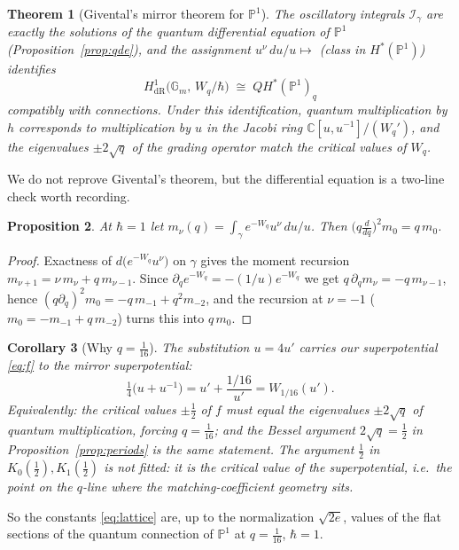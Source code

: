 \documentclass[11pt]{article}
\newtheorem{proposition}{Proposition}[section]
\newtheorem{theorem}[proposition]{Theorem}
\newtheorem{corollary}[proposition]{Corollary}
\theoremstyle{definition}
\theoremstyle{remark}
\newcommand{\C}{\mathbb{C}}
\newcommand{\Gm}{\mathbb{G}_m}
\newcommand{\PP}{\mathbb{P}}
\newcommand{\dR}{\mathrm{dR}}
\newcommand{\hbarr}{\hbar}
\begin{document}
\begin{theorem}[Givental's mirror theorem for $\PP^1$]
\label{thm:mirror}
The oscillatory integrals $\mathcal I_\gamma$ are exactly the
solutions of the quantum differential equation of $\PP^1$
(Proposition~\ref{prop:qde}), and the assignment
$u^\nu\,du/u \mapsto$ (class in $H^\ast(\PP^1)$) identifies
\[
  H^1_{\dR}\bigl(\Gm,\, W_q/\hbarr\bigr) \;\cong\;
  QH^\ast(\PP^1)_q
\]
compatibly with connections. Under this identification, quantum
multiplication by $h$ corresponds to multiplication by $u$ in the
Jacobi ring $\C[u,u^{-1}]/(W_q')$, and the eigenvalues
$\pm 2\sqrt q$ of the grading operator match the critical values of
$W_q$.
\end{theorem}

We do not reprove Givental's theorem, but the differential
equation is a two-line check worth recording.

\begin{proposition}
At $\hbarr = 1$ let $m_\nu(q) = \int_\gamma e^{-W_q}u^\nu\,du/u$.
Then $\bigl(q\frac{d}{dq}\bigr)^2 m_0 = q\,m_0$.
\end{proposition}

\begin{proof}
Exactness of $d\bigl(e^{-W_q}u^\nu\bigr)$ on $\gamma$ gives the
moment recursion $m_{\nu+1} = \nu\,m_\nu + q\,m_{\nu-1}$. Since
$\partial_q e^{-W_q} = -(1/u)e^{-W_q}$ we get
$q\,\partial_q m_\nu = -q\,m_{\nu-1}$, hence
$(q\partial_q)^2 m_0 = -q\,m_{-1} + q^2 m_{-2}$, and the recursion
at $\nu = -1$ ($m_0 = -m_{-1} + q\,m_{-2}$) turns this into
$q\,m_0$.
\end{proof}

\begin{corollary}[Why $q = \tfrac1{16}$]\label{cor:q}
The substitution $u = 4u'$ carries our superpotential
\eqref{eq:f} to the mirror superpotential:
\[
  \tfrac14\bigl(u + u^{-1}\bigr)
  = u' + \frac{1/16}{u'} = W_{1/16}(u').
\]
Equivalently: the critical values $\pm\tfrac12$ of $f$ must equal
the eigenvalues $\pm2\sqrt q$ of quantum multiplication, forcing
$q = \tfrac1{16}$; and the Bessel argument $2\sqrt q = \tfrac12$ in
Proposition~\ref{prop:periods} is the same statement. The
argument $\tfrac12$ in $K_0(\tfrac12), K_1(\tfrac12)$ is not
fitted: it is the critical value of the superpotential, i.e.\ the
point on the $q$-line where the matching-coefficient geometry
sits.
\end{corollary}

So the constants \eqref{eq:lattice} are, up to the normalization
$\sqrt{2e}$, values of the flat sections of the quantum connection
of $\PP^1$ at $q = \tfrac1{16}$, $\hbarr = 1$.
\end{document}
